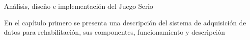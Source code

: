 \begin{thesischapter}{2} {Análisis, diseño e implementación del Juego Serio}

    En el capítulo primero se presenta una descripción del sistema de adquisición de datos para rehabilitación, sus componentes,
    funcionamiento y descripción
    

\end{thesischapter}